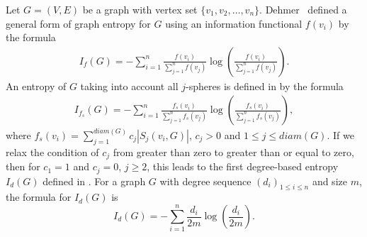 \documentclass{article}
\newcommand{\diam}{diam}
\begin{document}
Let $G=(V,E)$ be a graph with vertex set $\{v_1,v_2,\ldots,v_n\}$.
Dehmer~\cite{Dehmerfunctionals} defined a general form of graph entropy for $G$ using an information functional $f(v_i)$ by the formula
\begin{align*}
I_{f}(G)=-\sum_{i=1}^{n}\frac{f(v_i)}{\sum_{j=1}^{n}f(v_j)}\log\left(\frac{f(v_i)}{\sum_{j=1}^{n}f(v_j)}\right).
\end{align*}
An entropy of $G$ 
taking into account all $j$-spheres
is defined in \cite{Dehmer_Kraus,KDM13}
by the formula
\begin{align*}
I_{f_{s}}(G)=-\sum_{i=1}^{n}\frac{f_{s}(v_i)}{\sum_{j=1}^{n}f_{s}(v_j)}\log \left(\frac{f_{s}(v_i)}{\sum_{j=1}^{n}f_{s}(v_j)}\right),
\end{align*}
where $f_{s}(v_i)={\sum_{j=1}^{\diam(G)}c_j|S_j(v_i,G)|}$, $c_j>0$ and $1\leq j\leq \diam(G)$. 
If we relax the condition of $c_j$ from greater than zero to greater than or equal to zero, then for $c_1=1$ and $c_j=0$, $j\ge 2$, this leads to the first degree-based entropy $I_d(G)$ defined in \cite{CaoMR3212009}. For a graph $G$ with degree sequence $(d_i)_{1 \le i \le n}$ and size $m$, the formula for $I_d(G)$ is
$$I_d(G)=-\sum_{i=1}^n \frac{d_i}{2m}\log\left( \frac{d_i}{2m} \right).$$
\end{document}
